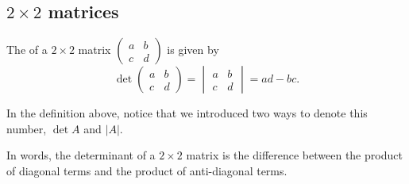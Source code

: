 \documentclass{ximera}
\begin{document}
\subsection{$2 \times 2$ matrices}
\begin{definition}
  The  of a $2 \times 2$ matrix $\begin{pmatrix} a & b \\
    c & d \end{pmatrix}$ is given by
  \[
    \det
    \begin{pmatrix}
      a & b\\
      c & d
    \end{pmatrix}
    =
    \begin{vmatrix}
      a & b\\
      c & d
    \end{vmatrix}
    = ad - bc.
  \]
\end{definition}

In the definition above, notice that we introduced two ways to denote
this number, $\det A$ and $|A|$.

In words, the determinant of a $2 \times 2$ matrix is the difference between
the product of diagonal terms and the product of anti-diagonal terms.
\begin{center}
\end{center}
\end{document}
